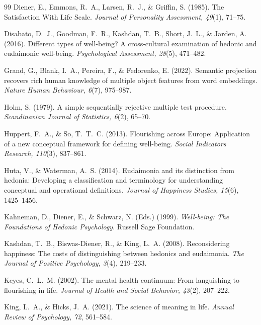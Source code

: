 \documentclass[12pt,a4paper]{article}
\begin{document}
\begin{thebibliography}{99}
Diener, E., Emmons, R.~A., Larsen, R.~J., \& Griffin, S. (1985).
The Satisfaction With Life Scale.
\textit{Journal of Personality Assessment, 49}(1), 71--75.

Disabato, D.~J., Goodman, F.~R., Kashdan, T.~B., Short, J.~L., \& Jarden, A. (2016).
Different types of well-being? A cross-cultural examination of hedonic and eudaimonic well-being.
\textit{Psychological Assessment, 28}(5), 471--482.

Grand, G., Blank, I.~A., Pereira, F., \& Fedorenko, E. (2022).
Semantic projection recovers rich human knowledge of multiple object features from word embeddings.
\textit{Nature Human Behaviour, 6}(7), 975--987.

Holm, S. (1979).
A simple sequentially rejective multiple test procedure.
\textit{Scandinavian Journal of Statistics, 6}(2), 65--70.

Huppert, F.~A., \& So, T.~T.~C. (2013).
Flourishing across Europe: Application of a new conceptual framework for defining well-being.
\textit{Social Indicators Research, 110}(3), 837--861.

Huta, V., \& Waterman, A.~S. (2014).
Eudaimonia and its distinction from hedonia: Developing a classification and terminology for understanding conceptual and operational definitions.
\textit{Journal of Happiness Studies, 15}(6), 1425--1456.

Kahneman, D., Diener, E., \& Schwarz, N. (Eds.) (1999).
\textit{Well-being: The Foundations of Hedonic Psychology}.
Russell Sage Foundation.

Kashdan, T.~B., Biswas-Diener, R., \& King, L.~A. (2008).
Reconsidering happiness: The costs of distinguishing between hedonics and eudaimonia.
\textit{The Journal of Positive Psychology, 3}(4), 219--233.

Keyes, C.~L.~M. (2002).
The mental health continuum: From languishing to flourishing in life.
\textit{Journal of Health and Social Behavior, 43}(2), 207--222.

King, L.~A., \& Hicks, J.~A. (2021).
The science of meaning in life.
\textit{Annual Review of Psychology, 72}, 561--584.


\end{thebibliography}
\end{document}
